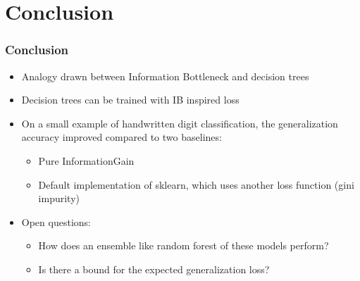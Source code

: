 \section[Conclusion]{Conclusion}

\begin{frame}
    \frametitle{Conclusion}
    \begin{itemize}
        \item Analogy drawn between Information Bottleneck and decision trees
        \item Decision trees can be trained with IB inspired loss
        \item On a small example of handwritten digit classification, the generalization accuracy improved compared to two baselines:
        \begin{itemize}
            \item Pure InformationGain
            \item Default implementation of sklearn, which uses another loss function (gini impurity)
        \end{itemize}
        \item Open questions:
        \begin{itemize}
            \item How does an ensemble like random forest of these models perform? 
            \item Is there a bound for the expected generalization loss?
        \end{itemize}
    \end{itemize}
\end{frame}
